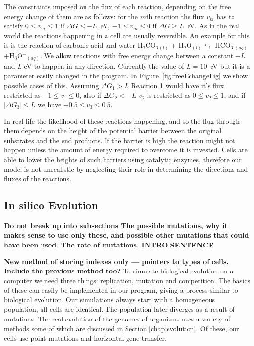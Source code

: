 \documentclass[10pt,a4paper]{article}
\begin{document}
	The constraints imposed on the flux of each reaction, depending on the free energy change of them are as follows: for the $m$th reaction the flux $v_m$ has to satisfy $0\leq v_m \leq 1 $ if $\Delta G \leq -L$~eV, $-1\leq v_m \leq 0 $ if $\Delta G \geq L$~eV. As in the real world the reactions happening in a cell are usually reversible.  An example for this is is the reaction of carbonic acid and water H$_2$CO$_3$$_{(l)}$ + H$_2$O$_{(l)} \leftrightarrows$ HCO$^-_3$$_{(aq)}$+H$_3$O$^+$$_{(aq)}$. We allow reactions with free energy change between a constant $-L$ and $L$ eV to happen in any direction. Currently the value of $L=10$~eV but it is a parameter easily changed in the program. In Figure~\ref{fig:freeEchangeFig} we show possible cases of this. Assuming $\Delta G_1 > L$ Reaction 1 would have it's flux restricted as $-1\leq v_1 \leq 0$, also if $\Delta G_2 < -L$ $v_2$ is restricted as $0 \leq v_2 \leq 1$, and if $|\Delta G_3 | \leq L$ we have $-0.5 \leq v_3 \leq 0.5$. 

	In real life the likelihood of these reactions happening, and so the flux through them depends on the height of the potential barrier between the original substrates and the end products. If the barrier is high the reaction might not happen unless the amount of energy required to overcome it is invested. Cells are able to lower the heights of such barriers using catalytic enzymes, therefore our model is not unrealistic by neglecting their role in determining the directions and fluxes of the reactions. 

\subsection{In silico Evolution}
\label{sub:implementing evolution}
\textbf{
Do not break up into subsections
The possible mutations, why it makes sense to use only these, and possible other mutations that could have been used. The rate of mutations. 
INTRO SENTENCE}

\textbf{New method of storing indexes only --- pointers to types of cells. Include the previous method too?}
To simulate biological evolution on a computer we need three things: replication, mutation and competition. The basics of these can easily be implemented in our program, giving a process similar to biological evolution. Our simulations always start with a homogeneous population, all cells are identical. The population later diverges as a result of mutations. The real evolution of the genomes of organisms uses a variety of methods some of which are discussed in Section \ref{chap:evolution}. Of these, our cells use point mutations and horizontal gene transfer.
	
\end{document}
